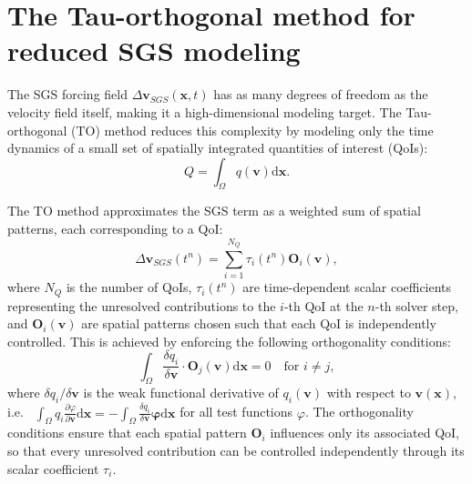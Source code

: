 \documentclass[]{elsarticle}
\newcommand{\D}{\mathrm{d}}
\begin{document}
\section{The Tau-orthogonal method for reduced SGS modeling}\label{sec:tau-orthogonal-method-reduced-sgs-modeling}
The SGS forcing field $\Delta \boldsymbol{v}_{SGS}(\boldsymbol{x},t)$ has as many degrees of freedom as the velocity field itself, making it a high-dimensional modeling target. The Tau-orthogonal (TO) method reduces this complexity by modeling only the time dynamics of a small set of spatially integrated quantities of interest (QoIs):
\begin{equation} \label{eq:qoi-def}
    Q = \int_{\Omega} q(\boldsymbol{v}) \D \boldsymbol{x}.
\end{equation}

The TO method approximates the SGS term as a weighted sum of spatial patterns, each corresponding to a QoI:
\begin{equation} \label{eq:TO-ansatz}
    \Delta \boldsymbol{v}_{SGS}(t^n) = \sum_{i=1}^{N_Q} \tau_i(t^n) \boldsymbol{O}_i(\boldsymbol{v}),
\end{equation}
where $N_Q$ is the number of QoIs, $\tau_i(t^n)$ are time-dependent scalar coefficients representing the unresolved contributions to the $i$-th QoI at the $n$-th solver step, and $\boldsymbol{O}_i(\boldsymbol{v})$ are spatial patterns chosen such that each QoI is independently controlled. This is achieved by enforcing the following orthogonality conditions:
\begin{equation} \label{eq:orthogonality}
    \int_\Omega \frac{\delta q_i}{\delta \boldsymbol{v}} \cdot \boldsymbol{O}_j(\boldsymbol{v}) \D \boldsymbol{x} = 0 \quad \text{for } i \neq j,
\end{equation}
where $\delta q_i / \delta \boldsymbol{v}$ is the weak functional derivative of $q_i(\boldsymbol{v})$ with respect to $\boldsymbol{v}(\boldsymbol{x})$, i.e. \ $\int_\Omega q_i \frac{\partial {\varphi}}{\partial \boldsymbol{v}} \D \boldsymbol{x}=-\int_\Omega \frac{\delta q_i }{ \delta \boldsymbol{v}} \boldsymbol{\varphi} \D \boldsymbol{x}$ for all test functions $\varphi$. The orthogonality conditions ensure that each spatial pattern $\boldsymbol{O}_i$ influences only its associated QoI, so that every unresolved contribution can be controlled independently through its scalar coefficient $\tau_i$.
\end{document}
